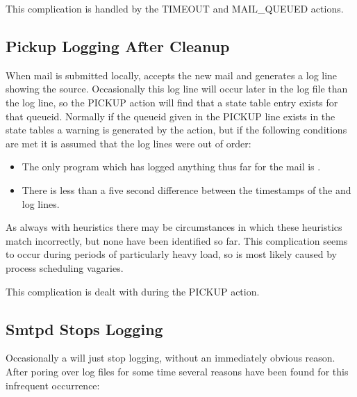 This complication is handled by the TIMEOUT and MAIL\_QUEUED actions.

\subsection{Pickup Logging After Cleanup}

\label{pickup logging after cleanup}

When mail is submitted locally,  accepts the new mail and
generates a log line showing the source.  Occasionally this log line will
occur later in the log file than the  log line, so the
PICKUP action will find that a state table entry exists for that queueid.
Normally if the queueid given in the PICKUP line exists in the state tables
a warning is generated by the  action, but if the following
conditions are met it is assumed that the log lines were out of order:

\begin{itemize}

    \item The only program which has logged anything thus far for the mail
        is .

    \item There is less than a five second difference between the
        timestamps of the  and  log lines.

\end{itemize}

As always with heuristics there may be circumstances in which these
heuristics match incorrectly, but none have been identified so far.  This
complication seems to occur during periods of particularly heavy load, so
is most likely caused by process scheduling vagaries.  

This complication is dealt with during the PICKUP action.

\subsection{Smtpd Stops Logging}

\label{smtpd stops logging}

Occasionally a  will just stop logging, without an
immediately obvious reason.  After poring over log files for some time
several reasons have been found for this infrequent occurrence:


